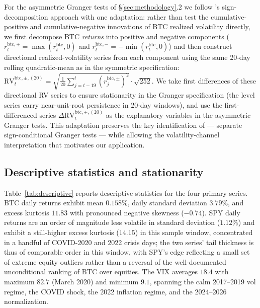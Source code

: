 \documentclass[11pt,a4paper]{article}
\begin{document}
For the asymmetric Granger tests of \S\ref{sec:methodology}.2 we follow \citet{hatemi2012}'s sign-decomposition approach with one adaptation: rather than test the cumulative-positive and cumulative-negative innovations of BTC realized volatility directly, we first decompose BTC \emph{returns} into positive and negative components ($r^{\text{btc},+}_t = \max(r^{\text{btc}}_t, 0)$ and $r^{\text{btc},-}_t = -\min(r^{\text{btc}}_t, 0)$) and then construct directional realized-volatility series from each component using the same 20-day rolling quadratic-mean as in the symmetric specification: $\text{RV}^{\text{btc},\pm,(20)}_t = \sqrt{\frac{1}{20}\sum_{j=t-19}^{t}(r^{\text{btc},\pm}_j)^2} \cdot \sqrt{252}$. We take first differences of these directional RV series to ensure stationarity in the Granger specification (the level series carry near-unit-root persistence in 20-day windows), and use the first-differenced series $\Delta \text{RV}^{\text{btc},\pm,(20)}_t$ as the explanatory variables in the asymmetric Granger tests. This adaptation preserves the key identification of \citet{hatemi2012} --- separate sign-conditional Granger tests --- while allowing the volatility-channel interpretation that motivates our application.

\subsection{Descriptive statistics and stationarity}

Table~\ref{tab:descriptive} reports descriptive statistics for the four primary series. BTC daily returns exhibit mean $0.158\%$, daily standard deviation $3.79\%$, and excess kurtosis $11.83$ with pronounced negative skewness ($-0.74$). SPY daily returns are an order of magnitude less volatile in standard deviation ($1.12\%$) and exhibit a still-higher excess kurtosis ($14.15$) in this sample window, concentrated in a handful of COVID-2020 and 2022 crisis days; the two series' tail thickness is thus of comparable order in this window, with SPY's edge reflecting a small set of extreme equity outliers rather than a reversal of the well-documented unconditional ranking of BTC over equities. The VIX averages $18.4$ with maximum $82.7$ (March 2020) and minimum $9.1$, spanning the calm 2017--2019 vol regime, the COVID shock, the 2022 inflation regime, and the 2024--2026 normalization.%
\end{document}
